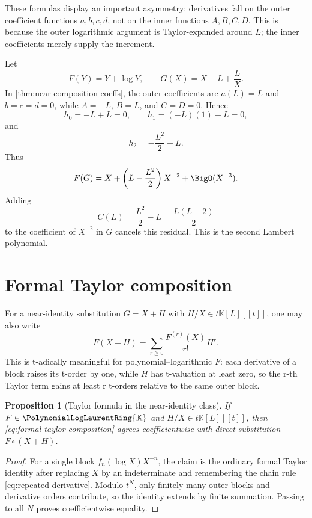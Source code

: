 \documentclass[11pt,openany]{book}
\theoremstyle{definition}
\theoremstyle{plain}
\newtheorem{proposition}{Proposition}[chapter]
\theoremstyle{remark}
\newcommand{\K}{\mathbb{K}}
\newcommand{\compose}{\mathbin{\circ}}
\begin{document}
These formulas display an important asymmetry: derivatives fall on the outer
coefficient functions \(a,b,c,d\), not on the inner functions \(A,B,C,D\).
This is because the outer logarithmic argument is Taylor-expanded around
\(L\); the inner coefficients merely supply the increment.

\begin{workedbox}[title={One step toward Lambert \(W\)}]
Let
\[
 F(Y)=Y+\log Y,
 \qquad
 G(X)=X-L+\frac{L}{X}.
\]
In \cref{thm:near-composition-coeffs}, the outer coefficients are
\(a(L)=L\) and \(b=c=d=0\), while \(A=-L\), \(B=L\), and \(C=D=0\).  Hence
\[
 h_0=-L+L=0,
 \qquad
 h_1=(-L)(1)+L=0,
\]
and
\[
 h_2=-\frac{L^2}{2}+L.
\]
Thus
\[
 F(G)=X+\left(L-\frac{L^2}{2}\right)X^{-2}+\BigO(X^{-3}).
\]
Adding
\[
 C(L)=\frac{L^2}{2}-L=\frac{L(L-2)}2
\]
to the coefficient of \(X^{-2}\) in \(G\) cancels this residual.  This is the
second Lambert polynomial.
\end{workedbox}

\section{Formal Taylor composition}
For a near-identity substitution \(G=X+H\) with \(H/X\in t\K[L][[t]]\), one
may also write
\begin{equation}\label{eq:formal-taylor-composition}
 F(X+H)=\sum_{r\ge0}\frac{F^{(r)}(X)}{r!}H^r.
\end{equation}
This is t-adically meaningful for polynomial--logarithmic \(F\): each
derivative of a block raises its t-order by one, while \(H\) has t-valuation at
least zero, so the r-th Taylor term gains at least r t-orders relative to the
same outer block.

\begin{proposition}[Taylor formula in the near-identity class]\label{prop:taylor-composition}
If \(F\in\PolynomialLogLaurentRing{\K}\) and \(H/X\in t\K[L][[t]]\), then
\cref{eq:formal-taylor-composition} agrees coefficientwise with direct
substitution \(F\compose(X+H)\).
\end{proposition}
\begin{proof}
For a single block \(f_n(\log X)X^{-n}\), the claim is the ordinary formal
Taylor identity after replacing \(X\) by an indeterminate and remembering the
chain rule \cref{eq:repeated-derivative}.  Modulo \(t^N\), only finitely many
outer blocks and derivative orders contribute, so the identity extends by
finite summation.  Passing to all \(N\) proves coefficientwise equality.
\end{proof}
\end{document}

